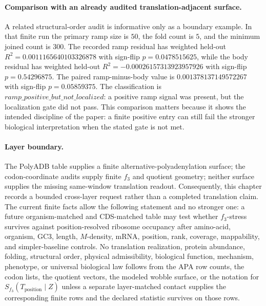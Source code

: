 \paragraph{Comparison with an already audited translation-adjacent surface.}
A related structural-order audit is informative only as a boundary example.  In that finite run the primary ramp size is $50$, the fold count is $5$, and the minimum joined count is $300$.  The recorded ramp residual has weighted held-out $R^2=0.0011165640103326878$ with sign-flip $p=0.0478515625$, while the body residual has weighted held-out $R^2=-0.00026157313923957926$ with sign-flip $p=0.54296875$.  The paired ramp-minus-body value is $0.001378137149572267$ with sign-flip $p=0.05859375$.  The classification is $ramp\_positive\_but\_not\_localized$: a positive ramp signal was present, but the localization gate did not pass.  This comparison matters because it shows the intended discipline of the paper: a finite positive entry can still fail the stronger biological interpretation when the stated gate is not met.

\paragraph{Layer boundary.}
The PolyADB table supplies a finite alternative-polyadenylation surface; the codon-coordinate audits supply finite $f_3$ and quotient geometry; neither surface supplies the missing same-window translation readout.  Consequently, this chapter records a bounded cross-layer request rather than a completed translation claim.  The current finite facts allow the following statement and no stronger one: a future organism-matched and CDS-matched table may test whether $f_3$-stress survives against position-resolved ribosome occupancy after amino-acid, organism, GC3, length, $M$-density, mRNA, position, rank, coverage, mappability, and simpler-baseline controls.  No translation realization, protein abundance, folding, structural order, physical admissibility, biological function, mechanism, phenotype, or universal biological law follows from the APA row counts, the codon lists, the quotient vectors, the modeled wobble surface, or the notation for $S_{f_3}(T_{\mathrm{position}}\mid Z)$ unless a separate layer-matched contact supplies the corresponding finite rows and the declared statistic survives on those rows.